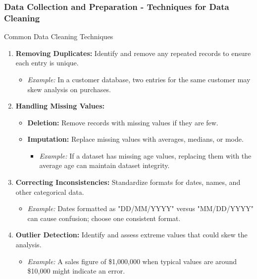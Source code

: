 \documentclass[aspectratio=169]{beamer}
\begin{document}
\begin{frame}[fragile]
  \frametitle{Data Collection and Preparation - Techniques for Data Cleaning}

  \begin{block}{Common Data Cleaning Techniques}
    \begin{enumerate}
      \item \textbf{Removing Duplicates:}
        Identify and remove any repeated records to ensure each entry is unique.
        \begin{itemize}
          \item \textit{Example:} In a customer database, two entries for the same customer may skew analysis on purchases.
        \end{itemize}
      
      \item \textbf{Handling Missing Values:}
        \begin{itemize}
          \item \textbf{Deletion:} Remove records with missing values if they are few.
          \item \textbf{Imputation:} Replace missing values with averages, medians, or mode.
            \begin{itemize}
              \item \textit{Example:} If a dataset has missing age values, replacing them with the average age can maintain dataset integrity.
            \end{itemize}
        \end{itemize}
      
      \item \textbf{Correcting Inconsistencies:}
        Standardize formats for dates, names, and other categorical data.
        \begin{itemize}
          \item \textit{Example:} Dates formatted as "DD/MM/YYYY" versus "MM/DD/YYYY" can cause confusion; choose one consistent format.
        \end{itemize}
      
      \item \textbf{Outlier Detection:}
        Identify and assess extreme values that could skew the analysis.
        \begin{itemize}
          \item \textit{Example:} A sales figure of \$1,000,000 when typical values are around \$10,000 might indicate an error.
        \end{itemize}
    \end{enumerate}
  \end{block}

\end{frame}
\end{document}
